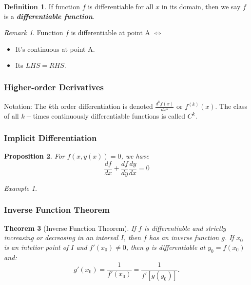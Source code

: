 \documentclass{amsproc}
\newtheorem{theorem}{Theorem}[section]
\newtheorem{proposition}[theorem]{Proposition}
\theoremstyle{definition}
\newtheorem{definition}[theorem]{Definition}
\theoremstyle{remark}
\newtheorem*{example*}{Example}
\newtheorem*{remark*}{Remark}
\numberwithin{equation}{section}
\begin{document}
\begin{definition}
    If function $f$ is differentiable for all $x$ in its domain, then we say $f$ is a \textbf{\textit{differentiable function}}.
\end{definition}

\begin{remark*}
    Function $f$ is differentiable at point A $\iff $
    \begin{itemize}
        \item It's continuous at point A.
        \item Its $LHS = RHS$.
    \end{itemize}
\end{remark*}

\subsubsection{Higher-order Derivatives}

Notation: The $k$th order differentiation is denoted $\frac{d ^{k}f(x)}{dx ^{k}}$ or $f ^{(k)}(x)$. The class of all $k-$times continuously differentiable functions is called $C^k$.

\subsubsection{Implicit Differentiation}

\begin{proposition}
    For $f(x, y(x)) = 0$, we have \begin{equation*}
        \frac{df}{dx} + \frac{df}{dy}\frac{dy}{dx} = 0
    \end{equation*}
\end{proposition}

\begin{example*}
\end{example*}


\subsubsection{Inverse Function Theorem}

\begin{theorem}[Inverse Function Theorem]
    If $f$ is differentiable and strictly increasing or decreasing in an interval $I$, then $f$ has an inverse function $g$. If $x_0$ is an intetior point of $I$ and $f'(x_0) \neq 0$, then $g$ is differentiable at $y_0 = f(x_0)$ and: \begin{equation*}
        g'(x_0) = \frac{1}{f'(x_0)} = \frac{1}{f'[g(y_0)]}.
    \end{equation*}
\end{theorem}
\end{document}
